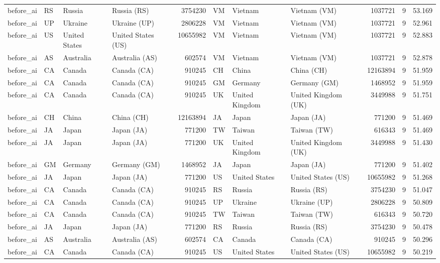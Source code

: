 \begin{tabular}{llllrlllrrr}
before\_ai & RS & Russia & Russia (RS) & 3754230 & VM & Vietnam & Vietnam (VM) & 1037721 & 9 & 53.169 \\
before\_ai & UP & Ukraine & Ukraine (UP) & 2806228 & VM & Vietnam & Vietnam (VM) & 1037721 & 9 & 52.961 \\
before\_ai & US & United States & United States (US) & 10655982 & VM & Vietnam & Vietnam (VM) & 1037721 & 9 & 52.883 \\
before\_ai & AS & Australia & Australia (AS) & 602574 & VM & Vietnam & Vietnam (VM) & 1037721 & 9 & 52.878 \\
before\_ai & CA & Canada & Canada (CA) & 910245 & CH & China & China (CH) & 12163894 & 9 & 51.959 \\
before\_ai & CA & Canada & Canada (CA) & 910245 & GM & Germany & Germany (GM) & 1468952 & 9 & 51.959 \\
before\_ai & CA & Canada & Canada (CA) & 910245 & UK & United Kingdom & United Kingdom (UK) & 3449988 & 9 & 51.751 \\
before\_ai & CH & China & China (CH) & 12163894 & JA & Japan & Japan (JA) & 771200 & 9 & 51.469 \\
before\_ai & JA & Japan & Japan (JA) & 771200 & TW & Taiwan & Taiwan (TW) & 616343 & 9 & 51.469 \\
before\_ai & JA & Japan & Japan (JA) & 771200 & UK & United Kingdom & United Kingdom (UK) & 3449988 & 9 & 51.430 \\
before\_ai & GM & Germany & Germany (GM) & 1468952 & JA & Japan & Japan (JA) & 771200 & 9 & 51.402 \\
before\_ai & JA & Japan & Japan (JA) & 771200 & US & United States & United States (US) & 10655982 & 9 & 51.268 \\
before\_ai & CA & Canada & Canada (CA) & 910245 & RS & Russia & Russia (RS) & 3754230 & 9 & 51.047 \\
before\_ai & CA & Canada & Canada (CA) & 910245 & UP & Ukraine & Ukraine (UP) & 2806228 & 9 & 50.809 \\
before\_ai & CA & Canada & Canada (CA) & 910245 & TW & Taiwan & Taiwan (TW) & 616343 & 9 & 50.720 \\
before\_ai & JA & Japan & Japan (JA) & 771200 & RS & Russia & Russia (RS) & 3754230 & 9 & 50.478 \\
before\_ai & AS & Australia & Australia (AS) & 602574 & CA & Canada & Canada (CA) & 910245 & 9 & 50.296 \\
before\_ai & CA & Canada & Canada (CA) & 910245 & US & United States & United States (US) & 10655982 & 9 & 50.219 \\

\end{tabular}
